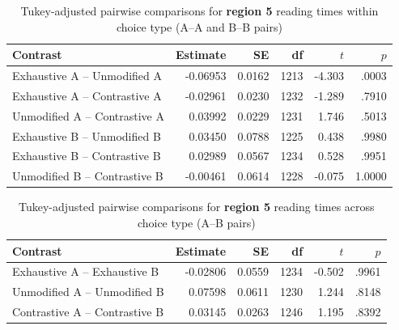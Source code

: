 \documentclass[ruler]{CUP-JNL-LIN}%
\begin{document}
\begin{table}[htbp]
\centering
\caption{Tukey-adjusted pairwise comparisons for \textbf{region 5} reading times within choice type (A--A and B--B pairs)}
\label{tab:r5-pairwise-within-choice}
\begin{tabularx}{\textwidth}{@{}Xrrrrr@{}}
\toprule
Contrast & Estimate & SE & df & $t$ & $p$ \\
\midrule
Exhaustive A -- Unmodified A   & -0.06953 & 0.0162 & 1213 & -4.303 & .0003 \\
Exhaustive A -- Contrastive A  & -0.02961 & 0.0230 & 1232 & -1.289 & .7910 \\
Unmodified A -- Contrastive A  &  0.03992 & 0.0229 & 1231 &  1.746 & .5013 \\
Exhaustive B -- Unmodified B   &  0.03450 & 0.0788 & 1225 &  0.438 & .9980 \\
Exhaustive B -- Contrastive B  &  0.02989 & 0.0567 & 1234 &  0.528 & .9951 \\
Unmodified B -- Contrastive B  & -0.00461 & 0.0614 & 1228 & -0.075 & 1.0000 \\
\bottomrule
\end{tabularx}
\end{table}

\begin{table}[htbp]
\centering
\caption{Tukey-adjusted pairwise comparisons for \textbf{region 5} reading times across choice type (A--B pairs)}
\label{tab:r5-pairwise-across-choice}
\begin{tabularx}{\textwidth}{@{}Xrrrrr@{}}
\toprule
Contrast & Estimate & SE & df & $t$ & $p$ \\
\midrule
Exhaustive A -- Exhaustive B   & -0.02806 & 0.0559 & 1234 & -0.502 & .9961 \\
Unmodified A -- Unmodified B   &  0.07598 & 0.0611 & 1230 &  1.244 & .8148 \\
Contrastive A -- Contrastive B &  0.03145 & 0.0263 & 1246 &  1.195 & .8392 \\
\bottomrule
\end{tabularx}
\end{table}
\end{document}
